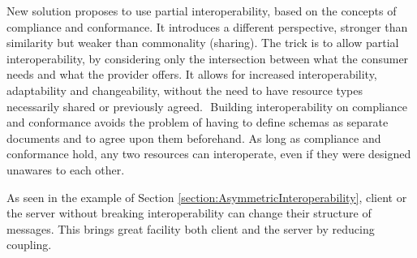 New solution proposes to use partial interoperability, based on the concepts of compliance and conformance. It introduces a different perspective, stronger than similarity but weaker than commonality (sharing). The trick is to allow partial interoperability, by considering only the intersection between what the consumer needs and what the provider offers. It allows for increased interoperability, adaptability and changeability, without the need to have resource types necessarily shared or previously agreed.  Building interoperability on compliance and conformance avoids the problem of having to define schemas as separate documents and to agree upon them beforehand. As long as compliance and conformance hold, any two resources can interoperate, even if they were designed unawares to each other.

As seen in the example of Section \ref{section:AsymmetricInteroperability}, client or the server without breaking interoperability can change their structure of messages. This brings great facility both client and the server by reducing coupling.
